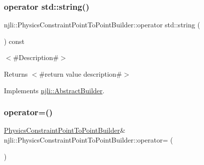 \subsubsection{\texorpdfstring{operator std\+::string()}{operator std::string()}}
{\footnotesize\ttfamily njli\+::\+Physics\+Constraint\+Point\+To\+Point\+Builder\+::operator std\+::string (\begin{DoxyParamCaption}{ }\end{DoxyParamCaption}) const\hspace{0.3cm}{\ttfamily [virtual]}}

$<$\#\+Description\#$>$

\begin{DoxyReturn}{Returns}
$<$\#return value description\#$>$ 
\end{DoxyReturn}


Implements \mbox{\hyperlink{classnjli_1_1_abstract_builder_a3e6e553e06d1ca30517ad5fb0bd4d000}{njli\+::\+Abstract\+Builder}}.

\mbox{\label{classnjli_1_1_physics_constraint_point_to_point_builder_adb8c14236faefa5f707beaba959fc887}} 
\subsubsection{\texorpdfstring{operator=()}{operator=()}}
{\footnotesize\ttfamily \mbox{\hyperlink{classnjli_1_1_physics_constraint_point_to_point_builder}{Physics\+Constraint\+Point\+To\+Point\+Builder}}\& njli\+::\+Physics\+Constraint\+Point\+To\+Point\+Builder\+::operator= (\begin{DoxyParamCaption}\item[{const \mbox{\hyperlink{classnjli_1_1_physics_constraint_point_to_point_builder}{Physics\+Constraint\+Point\+To\+Point\+Builder}} \&}]{ }\end{DoxyParamCaption})\hspace{0.3cm}{\ttfamily [protected]}}

\mbox{\label{classnjli_1_1_physics_constraint_point_to_point_builder_a49becf720b22a7be49ffb0228cb507c2}} 
